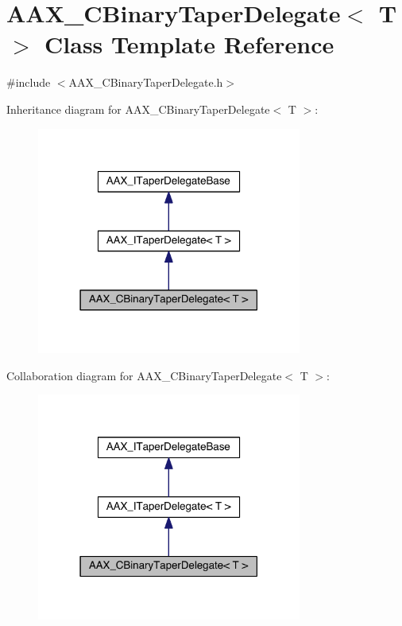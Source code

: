 \hypertarget{a00013}{}\section{A\+A\+X\+\_\+\+C\+Binary\+Taper\+Delegate$<$ T $>$ Class Template Reference}
\label{a00013}


{\ttfamily \#include $<$A\+A\+X\+\_\+\+C\+Binary\+Taper\+Delegate.\+h$>$}



Inheritance diagram for A\+A\+X\+\_\+\+C\+Binary\+Taper\+Delegate$<$ T $>$\+:
\nopagebreak
\begin{figure}[H]
\begin{center}
\leavevmode
\includegraphics[width=247pt]{a00399}
\end{center}
\end{figure}


Collaboration diagram for A\+A\+X\+\_\+\+C\+Binary\+Taper\+Delegate$<$ T $>$\+:
\nopagebreak
\begin{figure}[H]
\begin{center}
\leavevmode
\includegraphics[width=247pt]{a00400}
\end{center}
\end{figure}


